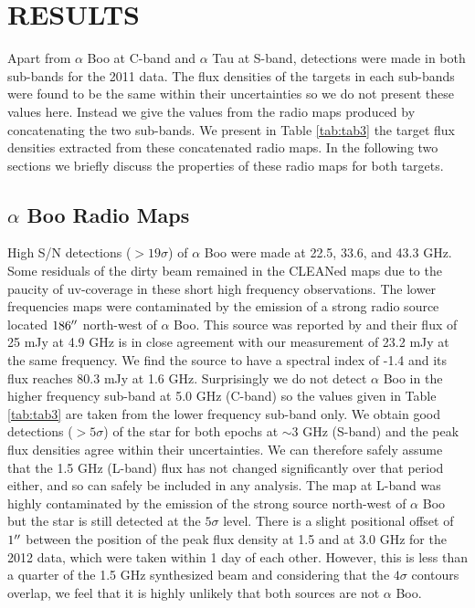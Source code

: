 \documentclass[iop]{emulateapj}
\begin{document}
\section{RESULTS} 

Apart from $\alpha$ Boo at C-band and $\alpha$ Tau at S-band, detections were made in both sub-bands for the 2011 data. The flux densities of the targets in each sub-bands were found to be the same within their uncertainties so we do not present these values here. Instead we give the values from the radio maps produced by concatenating the two sub-bands. We present in Table \ref{tab:tab3} the target flux densities extracted from these concatenated radio maps. In the following two sections we briefly discuss the properties of these radio maps for both targets.

\subsection{$\alpha$ Boo Radio Maps} \label{results1} 
High S/N detections ($>19\sigma$) of $\alpha$ Boo were made at 22.5, 33.6, and 43.3 GHz. Some residuals of the dirty beam remained in the CLEANed maps due to the paucity of uv-coverage in these short high frequency observations. The lower frequencies maps were contaminated by the emission of a strong radio source located $186\mbox{$^{\prime\prime}$}$ north-west of $\alpha$ Boo. This source was reported by \cite{1986AJ.....91..602D} and their flux of 25 mJy at 4.9 GHz is in close agreement with our measurement of 23.2 mJy at the same frequency. We find the source to have a spectral index of -1.4 and its flux reaches  80.3 mJy at 1.6 GHz. Surprisingly we do not detect $\alpha$ Boo in the higher frequency sub-band at 5.0 GHz (C-band) so the values given in Table \ref{tab:tab3} are taken from the lower frequency sub-band only. We obtain good detections ($>5\sigma$) of the star for both epochs at $\sim$3 GHz (S-band) and the peak flux densities agree within their uncertainties. We can therefore safely assume that the 1.5 GHz (L-band) flux has not changed significantly over that period either, and so can safely be included in any analysis. The map at L-band was highly contaminated by the emission of the strong source north-west of $\alpha$ Boo but the star is still detected at the $5\sigma$ level. There is a slight positional offset of $1\mbox{$^{\prime\prime}$}$ between the position of the peak flux density at 1.5 and at 3.0 GHz for the 2012 data, which were taken within 1 day of each other. However, this is less than a quarter of the 1.5 GHz synthesized beam and considering that the $4\sigma$ contours overlap, we feel that it is highly unlikely that both sources are not $\alpha$ Boo. 
\end{document}
